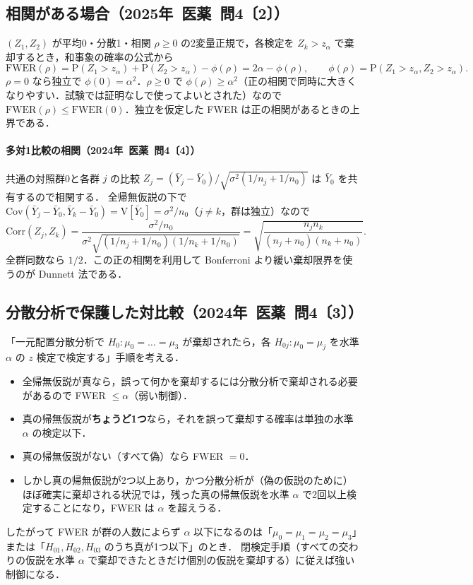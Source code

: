 \documentclass[a4paper,11pt,openany]{ltjsbook}
\newcommand{\kakomon}[2]{\mbox{#1年 医薬 問#2}}
\newcommand{\V}{\mathrm{V}}
\newcommand{\Cov}{\mathrm{Cov}}
\newcommand{\Corr}{\mathrm{Corr}}
\newcommand{\Prob}{\mathrm{P}}
\begin{document}
\subsection{相関がある場合（\kakomon{2025}{4}〔2〕）}
$(Z_1,Z_2)$ が平均0・分散1・相関 $\rho\ge0$ の2変量正規で，各検定を $Z_k>z_\alpha$ で棄却するとき，和事象の確率の公式から
\[
\mathrm{FWER}(\rho)=\Prob(Z_1>z_\alpha)+\Prob(Z_2>z_\alpha)-\phi(\rho)=2\alpha-\phi(\rho),\qquad\phi(\rho)=\Prob(Z_1>z_\alpha,Z_2>z_\alpha).
\]
$\rho=0$ なら独立で $\phi(0)=\alpha^2$．$\rho\ge0$ で $\phi(\rho)\ge\alpha^2$（正の相関で同時に大きくなりやすい．試験では証明なしで使ってよいとされた）なので
$\mathrm{FWER}(\rho)\le\mathrm{FWER}(0)$．独立を仮定した FWER は正の相関があるときの上界である．
\paragraph{多対1比較の相関（\kakomon{2024}{4}〔4〕）}
共通の対照群0と各群 $j$ の比較 $Z_j=(\bar Y_j-\bar Y_0)/\sqrt{\sigma^2(1/n_j+1/n_0)}$ は $\bar Y_0$ を共有するので相関する．
全帰無仮説の下で $\Cov(\bar Y_j-\bar Y_0,\bar Y_k-\bar Y_0)=\V[\bar Y_0]=\sigma^2/n_0$（$j\ne k$，群は独立）なので
\[
\Corr(Z_j,Z_k)=\frac{\sigma^2/n_0}{\sigma^2\sqrt{(1/n_j+1/n_0)(1/n_k+1/n_0)}}=\sqrt{\frac{n_jn_k}{(n_j+n_0)(n_k+n_0)}} .
\]
全群同数なら $1/2$．この正の相関を利用して Bonferroni より緩い棄却限界を使うのが Dunnett 法である．

\subsection{分散分析で保護した対比較（\kakomon{2024}{4}〔3〕）}
「一元配置分散分析で $H_0:\mu_0=\dots=\mu_3$ が棄却されたら，各 $H_{0j}:\mu_0=\mu_j$ を水準 $\alpha$ の $z$ 検定で検定する」手順を考える．
\begin{itemize}
\item 全帰無仮説が真なら，誤って何かを棄却するには分散分析で棄却される必要があるので FWER $\le\alpha$（弱い制御）．
\item 真の帰無仮説が\textbf{ちょうど1つ}なら，それを誤って棄却する確率は単独の水準 $\alpha$ の検定以下．
\item 真の帰無仮説がない（すべて偽）なら FWER $=0$．
\item しかし真の帰無仮説が2つ以上あり，かつ分散分析が（偽の仮説のために）ほぼ確実に棄却される状況では，残った真の帰無仮説を水準 $\alpha$ で2回以上検定することになり，FWER は $\alpha$ を超えうる．
\end{itemize}
したがって FWER が群の人数によらず $\alpha$ 以下になるのは「$\mu_0=\mu_1=\mu_2=\mu_3$」または「$H_{01},H_{02},H_{03}$ のうち真が1つ以下」のとき．
閉検定手順（すべての交わりの仮説を水準 $\alpha$ で棄却できたときだけ個別の仮説を棄却する）に従えば強い制御になる．
\end{document}
